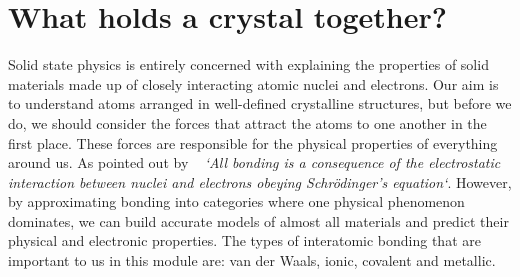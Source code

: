 \section{What holds a crystal together?}
\label{sec:bonding}


Solid state physics is entirely concerned with explaining the
properties of solid materials made up of closely interacting
atomic nuclei and electrons.  Our aim is to understand atoms arranged in well-defined crystalline structures, but before
we do, we should consider the forces that
attract the atoms to one another in the first place.  These
forces are responsible for the physical properties of everything
around us. As pointed out by
~\cite{Hook_and_hall} \emph{`All bonding is a consequence of the
electrostatic interaction between nuclei and electrons obeying
Schr\"{o}dinger's equation`}. However, by approximating bonding into categories where one physical phenomenon dominates, we can build accurate models of almost all materials and predict 
their physical and electronic properties. The types of interatomic bonding that are important to us in this module are: van der Waals, ionic, covalent and metallic.
